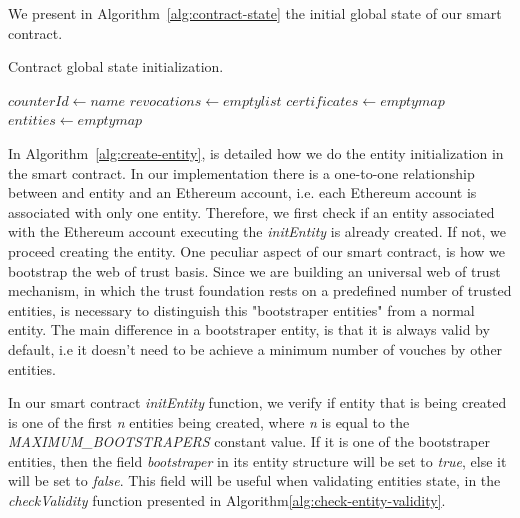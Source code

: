 We present in Algorithm~\ref{alg:contract-state} the initial global state of our smart contract.

\begin{algorithm}
  \caption{Contract global state initialization.}
  \label{alg:contract-state}
  \begin{algorithmic}
    \State $counterId \gets name$ 
    \State $revocations \gets empty list$ 
    \State $certificates \gets empty map$ 
    \State $entities \gets empty map$ 
  \end{algorithmic}
\end{algorithm}

In Algorithm~\ref{alg:create-entity}, is detailed how we do the entity initialization in the smart contract.
In our implementation there is a one-to-one relationship between and entity and an Ethereum account, i.e. each Ethereum account is associated with only one entity.
Therefore, we first check if an entity associated with the Ethereum account executing the \textit{initEntity} is already created.
If not, we proceed creating the entity.
One peculiar aspect of our smart contract, is how we bootstrap the web of trust basis.
Since we are building an universal web of trust mechanism, in which the trust foundation rests on a predefined number of trusted entities, is necessary to distinguish this "bootstraper entities" from a normal entity.
The main difference in a bootstraper entity, is that it is always valid by default, i.e it doesn't need to be achieve a minimum number of vouches by other entities.

In our smart contract \textit{initEntity} function, we verify if entity that is being created is one of the first \textit{n} entities being created, where \textit{n} is equal to the \textit{MAXIMUM\_BOOTSTRAPERS} constant value.
If it is one of the bootstraper entities, then the field \textit{bootstraper} in its entity structure will be set to \textit{true}, else it will be set to \textit{false}.
This field will be useful when validating entities state, in the \textit{checkValidity} function presented in Algorithm\ref{alg:check-entity-validity}.

